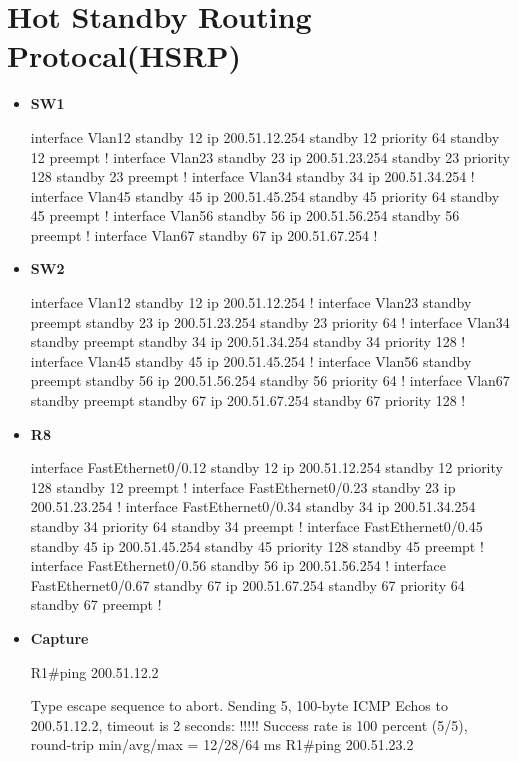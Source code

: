 \documentclass[10pt]{article}
\begin{document}
\section{Hot Standby Routing Protocal(HSRP)}
\begin{itemize}
	\item {\bf SW1}
	\begin{verbatim*}
		interface Vlan12
		 standby 12 ip 200.51.12.254
		 standby 12 priority 64
		 standby 12 preempt
		!
		interface Vlan23
		 standby 23 ip 200.51.23.254
		 standby 23 priority 128
		 standby 23 preempt
		!
		interface Vlan34
		 standby 34 ip 200.51.34.254
		!
		interface Vlan45
		 standby 45 ip 200.51.45.254
		 standby 45 priority 64
		 standby 45 preempt
		!
		interface Vlan56
		 standby 56 ip 200.51.56.254
		 standby 56 preempt
		!
		interface Vlan67
		 standby 67 ip 200.51.67.254
		!
	\end{verbatim*}
	\item {\bf SW2}
	\begin{verbatim*}
		interface Vlan12
		 standby 12 ip 200.51.12.254
		!
		interface Vlan23
		 standby preempt
		 standby 23 ip 200.51.23.254
		 standby 23 priority 64
		!
		interface Vlan34
		 standby preempt
		 standby 34 ip 200.51.34.254
		 standby 34 priority 128
		!
		interface Vlan45
		 standby 45 ip 200.51.45.254
		!
		interface Vlan56
		 standby preempt
		 standby 56 ip 200.51.56.254
		 standby 56 priority 64
		!
		interface Vlan67
		 standby preempt
		 standby 67 ip 200.51.67.254
		 standby 67 priority 128
		!
	\end{verbatim*}
	\item {\bf R8}
	\begin{verbatim*}
		interface FastEthernet0/0.12
		 standby 12 ip 200.51.12.254
		 standby 12 priority 128
		 standby 12 preempt
		!
		interface FastEthernet0/0.23
		 standby 23 ip 200.51.23.254
		!
		interface FastEthernet0/0.34
		 standby 34 ip 200.51.34.254
		 standby 34 priority 64
		 standby 34 preempt
		!
		interface FastEthernet0/0.45
		 standby 45 ip 200.51.45.254
		 standby 45 priority 128
		 standby 45 preempt
		!
		interface FastEthernet0/0.56
		 standby 56 ip 200.51.56.254
		!
		interface FastEthernet0/0.67
		 standby 67 ip 200.51.67.254
		 standby 67 priority 64
		 standby 67 preempt
		!         
	\end{verbatim*}
	\item {\bf Capture}
	\begin{verbatim*}
		R1#ping 200.51.12.2

		Type escape sequence to abort.
		Sending 5, 100-byte ICMP Echos to 200.51.12.2, timeout is 2 seconds:
		!!!!!
		Success rate is 100 percent (5/5), round-trip min/avg/max = 12/28/64 ms
		R1#ping 200.51.23.2


\end{verbatim*}
\end{itemize}
\end{document}
